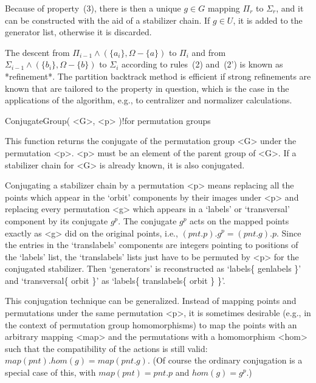 Because of property~(3), there is then a  unique $g\in G$ mapping $\Pi_r$
to $\Sigma_r$,  and it can be constructed   with the aid of  a stabilizer
chain.  If $g\in U$, it  is added to the  generator list, otherwise it is
discarded.

The descent from  $\Pi_{i-1}\wedge (\{a_i\},\Omega-\{a\})$ to $\Pi_i$ and
from $\Sigma_{i-1}\wedge (\{b_i\}, \Omega-\{b\})$ to $\Sigma_i$ according
to rules~(2)  and~(2') is known as  *refinement*. The partition backtrack
method is efficient if strong refinements are known  that are tailored to
the property  in question, which is  the case in  the applications of the
algorithm, e.g., to centralizer and normalizer calculations.


\>ConjugateGroup( <G>, <p> )!{for permutation groups}

This function  returns the conjugate  of the  permutation group <G> under
the permutation <p>. <p> must  be an element of  the parent group of <G>.
If a stabilizer chain for <G> is already known, it is also conjugated.

\danger Conjugating   a  stabilizer  chain by   a permutation   <p> means
replacing all the points which appear in  the `orbit' components by their
images under  <p> and replacing every  permutation <g> which appears in a
`labels' or `transversal' component by its conjugate $g^p$. The conjugate
$g^p$ acts on  the  mapped points  exactly   as <g> did on  the  original
points, i.e.,  $(pnt.p). g^p  =  (pnt.g).p$. Since   the entries  in  the
`translabels' components are  integers    pointing to positions of    the
`labels' list, the  `translabels' lists just  have to be permuted by  <p>
for the conjugated  stabilizer. Then   `generators' is reconstructed   as
`labels\{  genlabels   \}'  and `transversal\{  orbit   \}'  as `labels\{
translabels\{ orbit \} \}'.

This    conjugation technique    can be    generalized.  Instead of mapping  points and permutations under
the same permutation <p>, it is sometimes desirable (e.g., in the context
of permutation  group homomorphisms) to  map the points with an arbitrary
mapping <map>  and the permutations with  a homomorphism <hom>  such that
the  compatibility  of the actions is  still   valid: $map(pnt). hom(g) =
map(pnt.g)$. (Of course   the ordinary conjugation is  a  special case of
this, with $map(pnt) = pnt.p$ and $hom(g) = g^p$.)

